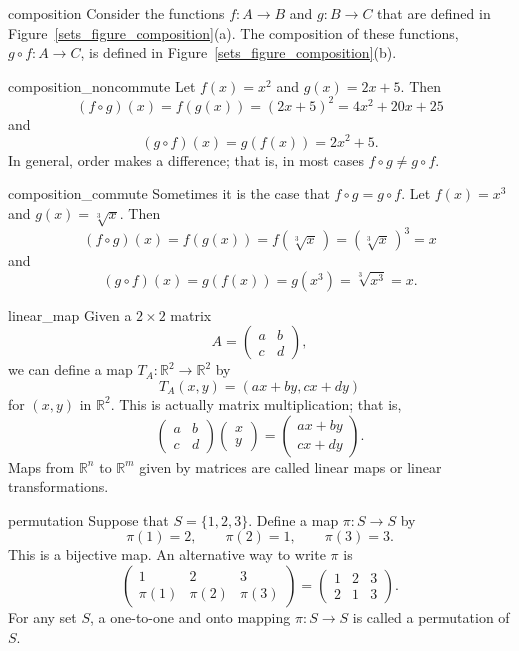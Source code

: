 \begin{example}{composition}
Consider the functions $f: A \rightarrow B$ and $g: B \rightarrow C$ that are defined in Figure~\ref{sets_figure_composition}(a).  The composition of these functions, $g \circ f: A \rightarrow C$, is defined in
Figure~\ref{sets_figure_composition}(b). 
\end{example}

\begin{example}{composition_noncommute}
Let $f(x) = x^2$ and $g(x) = 2x + 5$. Then
\[
(f \circ g)(x) = f(g(x)) = (2x + 5)^2 = 4x^2 + 20x + 25 
\]
and
\[
(g \circ f)(x) = g(f(x)) = 2x^2 + 5.
\]
In general, order makes a difference; that is, in most cases $f \circ g \neq g \circ f$. 
\end{example}
 
\begin{example}{composition_commute}
Sometimes it is the case that $f \circ g= g \circ f$.  Let $f(x) = x^3$ and $g(x) = \sqrt[3]{x}$. Then 
\[
(f \circ g )(x) = f(g(x)) = f( \sqrt[3]{x}\, ) = (\sqrt[3]{x}\, )^3 = x
\]
and
\[
(g \circ f )(x) = g(f(x)) = g( x^3) = \sqrt[3]{ x^3} = x.
\]
\end{example}
 
\begin{example}{linear_map}
Given a $2 \times 2$ matrix
\[
A =
\begin{pmatrix}
a & b \\
c & d
\end{pmatrix},
\]
we can define a map $T_A : {\mathbb R}^2 \rightarrow {\mathbb R}^2$ by 
\[
T_A (x,y) = (ax + by, cx +dy)
\]
for $(x,y)$ in ${\mathbb R}^2$.  This is actually matrix multiplication; that is,
\[
\begin{pmatrix}
a & b \\
c & d
\end{pmatrix}
\begin{pmatrix}
x \\ y
\end{pmatrix}
=
\begin{pmatrix}
ax + by \\
cx +dy
\end{pmatrix}.
\]
Maps from ${\mathbb R}^n$ to ${\mathbb R}^m$ given by matrices are called {\bfi linear maps\/} or {\bfi linear transformations}.
\end{example}

\begin{example}{permutation}
Suppose that $S = \{ 1,2,3  \}$. Define a map $\pi :S\rightarrow S$ by 
\[
\pi( 1 )  = 2, \qquad
\pi( 2 )  = 1, \qquad
\pi( 3 )  = 3.
\]
This is a bijective map.  An alternative way to  write $\pi$ is
\[
\begin{pmatrix}
1 & 2 & 3 \\
\pi(1) & \pi(2) & \pi(3)
\end{pmatrix}
=
\begin{pmatrix}
1 & 2 & 3 \\
2 & 1 & 3
\end{pmatrix}.
\]
For any set $S$, a one-to-one and onto mapping $\pi : S \rightarrow S$ is called a {\bfi permutation\/} of $S$. 
\end{example}

